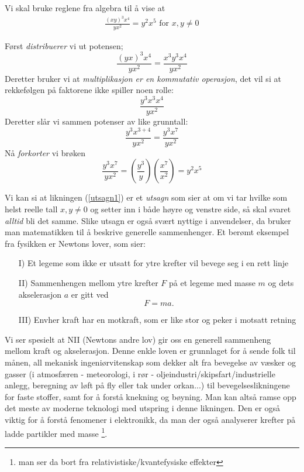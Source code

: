 \documentclass[11pt]{article}
\theoremstyle{definition}
\theoremstyle{definition}
\begin{document}
\begin{eksempel}\label{utsagn1}
Vi skal bruke reglene fra algebra til å vise at
\begin{align} 
\frac{(xy)^3x^4}{yx^2}  = y^2x^5 \text{ for } x,y \neq 0
\end{align}

Først \emph{distribuerer} vi ut potensen;
\[ \frac{(yx)^3x^4}{yx^2} = \frac{x^3y^3x^4}{yx^2} \] 
Deretter bruker vi at \emph{multiplikasjon er en kommutativ operasjon}, 
         det vil si at rekkefølgen på faktorene ikke spiller noen rolle:
\[ \frac{y^3x^3x^4}{yx^2}\]
Deretter slår vi sammen potenser av like grunntall:
\[ \frac{y^3x^{3 + 4}}{yx^2} = \frac{y^3x^{7}}{yx^2}\]
Nå \emph{forkorter} vi brøken
\[ \frac{y^3x^7}{yx^2} = \left(\frac{y^3}{y}\right)
    \left(\frac{x^7}{x^2}\right) = y^2x^5\]
\end{eksempel}


Vi kan si at likningen (\ref{utsagn1}) er et \emph{utsagn} som sier at om vi tar 
hvilke som helst reelle tall $x, y \neq 0$ og setter inn i både høyre og venstre
side, så skal svaret \emph{alltid} bli det samme.
Slike utsagn er også svært nyttige i anvendelser, da bruker man matematikken
til å beskrive generelle sammenhenger. Et berømt eksempel fra fysikken er 
Newtons lover, som sier:
\begin{itemize}
\item[I)]
Et legeme som ikke er utsatt for ytre krefter vil bevege seg i en
rett linje

\item[II)]
Sammenhengen mellom ytre krefter $F$ på et legeme med masse $m$ og dets
akselerasjon $a$ er gitt ved
\[ F = ma .\]

\item[III)]
Envher kraft har en motkraft, som er like stor og peker i motsatt retning

\end{itemize}



Vi ser spesielt at NII (Newtons andre lov) gir oss en generell sammenheng
mellom kraft og akselerasjon. Denne enkle loven er grunnlaget for å sende folk
til månen, all mekanisk ingeniørvitenskap som dekker alt fra bevegelse av
væsker og gasser (i atmosfæren - meteorologi, i rør -
        oljeindustri/skipsfart/industrielle anlegg, beregning av løft på fly
        eller tak under orkan...) til bevegelseslikningene for faste stoffer, samt for å forstå
knekning og bøyning. Man kan altså ramse opp det meste av moderne teknologi med
utspring i denne likningen. Den er også viktig for å forstå fenomener i
elektronikk, da man der også analyserer krefter på ladde partikler med masse
\footnote{man ser da bort fra relativistiske/kvantefysiske effekter}.
\end{document}
